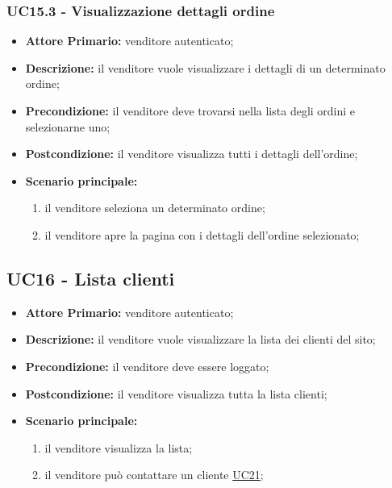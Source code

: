 \subsubsection{UC15.3 - Visualizzazione dettagli ordine}
\label{UC15.3}
\begin{itemize}
    \item \textbf{Attore Primario:} venditore autenticato;
    \item \textbf{Descrizione:} il venditore vuole visualizzare i dettagli di un determinato ordine;
    \item \textbf{Precondizione:} il venditore deve trovarsi nella lista degli ordini e selezionarne uno;
    \item \textbf{Postcondizione:} il venditore visualizza tutti i dettagli dell'ordine;
    \item \textbf{Scenario principale:}
    \begin{enumerate}
        \item il venditore seleziona un determinato ordine;
        \item il venditore apre la pagina con i dettagli dell'ordine selezionato;
    \end{enumerate}
\end{itemize}

\subsection{UC16 - Lista clienti}
\label{UC16}
\begin{itemize}
    \item \textbf{Attore Primario:} venditore autenticato;
    \item \textbf{Descrizione:} il venditore vuole visualizzare la lista dei clienti del sito;
    \item \textbf{Precondizione:} il venditore deve essere loggato;
    \item \textbf{Postcondizione:} il venditore visualizza tutta la lista clienti;
    \item \textbf{Scenario principale:}
    \begin{enumerate}
        \item il venditore visualizza la lista;
         \item il venditore può contattare un cliente \hyperref[UC12]{UC21};
    \end{enumerate}
\end{itemize}

